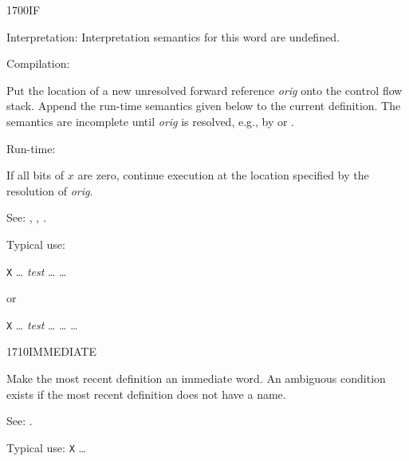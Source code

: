 \begin{newword*}{1700}{IF}
\item[Interpretation:]
	Interpretation semantics for this word are undefined.

\item[Compilation:]

	Put the location of a new unresolved forward reference
	\emph{orig} onto the control flow stack. Append the run-time
	semantics given below to the current definition. The semantics
	are incomplete until \emph{orig} is resolved, e.g., by
	 or .

\item[Run-time:]

	If all bits of $x$ are zero, continue execution at the location
	specified by the resolution of \emph{orig}.

\item[See:]
	,
	,
	.

	\begin{rationale} %
		Typical use:

		\tab \word{:} \texttt{X} {\ldots}
			\emph{test}  {\ldots} 
		{\ldots} \word{;}

		or

		\tab \word{:} \texttt{X} {\ldots}
			\emph{test} 
			{\ldots}  {\ldots} 
		{\ldots} \word{;}
	\end{rationale}
\end{newword*}


\begin{newword}{1710}{IMMEDIATE}
	\stack{}{}

	Make the most recent definition an immediate word. An ambiguous
	condition exists if the most recent definition does not have a
	name.

\item[See:]
	.

	\begin{rationale} %
		Typical use:
			\word{:} \texttt{X}
			{\ldots} \word{;} 
	\end{rationale}
\end{newword}


